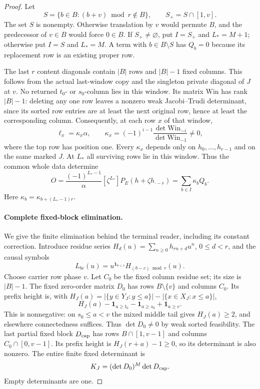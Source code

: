 \documentclass[11pt,a4paper]{amsart}
\numberwithin{equation}{section}
\theoremstyle{plain}
\theoremstyle{definition}
\newcommand{\one}{\mathbf1}
\begin{document}
\begin{proof}
Let
\[
 S=\{b\in B:(b+v)\bmod r\notin B\},\qquad S_+=S\cap[1,v].
\]
The set \(S\) is nonempty.  Otherwise translation by \(v\) would permute
\(B\), and the predecessor of \(v\in B\) would force \(0\in B\).
If \(S_+\ne\varnothing\), put \(I=S_+\) and \(L_*=M+1\); otherwise put
\(I=S\) and \(L_*=M\).  A term with \(b\in B\setminus S\) has \(Q_b=0\)
because its replacement row is an existing proper row.

The last \(r\) content diagonals contain \(|B|\) rows and \(|B|-1\)
fixed columns.  This follows from the actual last-window copy and
the singleton private diagonal of \(J\) at \(v\).  No returned
\(t_0\)- or \(s_0\)-column lies in this window.  Its matrix
\(\mathrm{Win}\) has rank \(|B|-1\): deleting any one row leaves a
nonzero weak Jacobi--Trudi determinant, since its sorted row
entries are at least the next original row, hence at least the
corresponding column.  Consequently, at each row \(x\) of that
window,
\begin{equation}\label{rt:mixed-window-cofactor}
 \ell_x=\kappa_x\alpha,\qquad
 \kappa_x=(-1)^{i-1}
       \frac{\det\mathrm{Win}_{-i}}{\det\mathrm{Win}_{-1}}\ne0,
\end{equation}
where the top row has position one.  Every \(\kappa_x\) depends only
on \(h_0,\ldots,h_{r-1}\) and on the same marked \(J\).
At \(L_*\) all surviving rows lie in this window.  Thus the common
whole data determine
\begin{equation}\label{rt:mixed-empty-observable}
 O=\frac{(-1)^{L_*-1}}{\alpha}
       [\zeta^{L_*}]P_E(h+\zeta h_{\cdot-r})
       =\sum_{b\in I}\kappa_bQ_b .
\end{equation}
Here \(\kappa_b=\kappa_{b+(L_*-1)r}\).

\paragraph{Complete fixed-block elimination.}
We give the finite elimination behind the terminal reader, including
its constant correction.  Introduce residue series
\(H_d(u)=\sum_{n\ge0}h_{rn+d}u^n\), \(0\le d<r\), and the causal
symbols
\[
 L_{bc}(u)=u^{\one_{b<c}}H_{(b-c)\bmod r}(u).
\]
Choose carrier row phase \(v\).  Let \(C_0\) be the fixed column residue
set; its size is \(|B|-1\).  The fixed zero-order matrix \(D_0\)
has rows \(B\setminus\{v\}\) and columns \(C_0\).  Its prefix
height is, with
\(H_J(a)=|\{y\in Y_J:y\le a\}|-|\{x\in X_J:x\le a\}|\),
\[
 H_J(a)-\one_{a\ge t_0}-\one_{a\ge s_0}+\one_{a\ge v}.
\]
This is nonnegative: on \(s_0\le a<v\) the mixed middle tail gives
\(H_J(a)\ge2\), and elsewhere connectedness suffices.
Thus \(\det D_0\ne0\) by weak sorted feasibility.
The last partial fixed block \(D_{\rm cap}\) has rows
\(B\cap[1,v-1]\) and columns \(C_0\cap[0,v-1]\).
Its prefix height is \(H_J(r+a)-1\ge0\), so its determinant is
also nonzero.  The entire finite fixed determinant is
\[
 K_J=(\det D_0)^M\det D_{\rm cap}.
\]
Empty determinants are one.


\end{proof}
\end{document}
